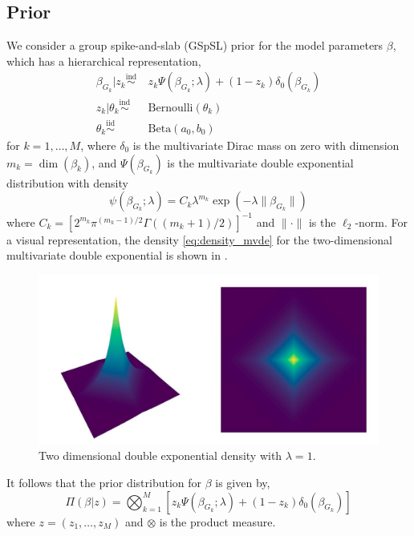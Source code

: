 \documentclass[12pt]{article}
\begin{document}
\subsection{Prior}

We consider a group spike-and-slab (GSpSL) prior for the model parameters $\beta$, which has a hierarchical representation,
\begin{equation}
\begin{aligned}
\beta_{G_k} | z_k \overset{\text{ind}}{\sim} &\ z_k \Psi(\beta_{G_k}; \lambda) + (1-z_k) \delta_0(\beta_{G_k}) \\
z_k | \theta_k \overset{\text{ind}}{\sim} &\ \text{Bernoulli}(\theta_k) \\
\theta_k \overset{\text{iid}}{\sim} &\ \text{Beta}(a_0, b_0)
\end{aligned}
\end{equation}
for $k=1,\dots,M$, where $\delta_0$ is the multivariate Dirac mass on zero with dimension $m_k = \dim(\beta_k)$, and $\Psi(\beta_{G_k})$ is the multivariate double exponential distribution with density
\begin{equation} \label{eq:density_mvde}
    \psi(\beta_{G_k}; \lambda) = C_k \lambda^{m_k} \exp \left( - \lambda \| \beta_{G_k} \| \right)
\end{equation}
where $ C_k = \left[ 2^{m_k} \pi^{(m_k -1)/2} \Gamma \left( (m_k + 1) /2 \right) \right]^{-1} $ and $ \| \cdot \| $ is the $\ell_2$-norm. For a visual representation, the density \eqref{eq:density_mvde} for the two-dimensional multivariate double exponential is shown in .
\begin{figure}[htp]
    \centering
    \includegraphics[width=.9\textwidth]{./figures/de.jpg}
    \caption{Two dimensional double exponential density with $\lambda=1$.}
    \label{fig:double_exp}
\end{figure}

It follows that the prior distribution for $\beta$ is given by,
\begin{equation} \label{eq:prior} 
    \Pi(\beta | z) = \bigotimes_{k=1}^{M} \left[ 
    z_k \Psi(\beta_{G_k}; \lambda) + (1-z_k)\delta_0(\beta_{G_k})
\right]
\end{equation}
where $z = (z_1, \dots, z_M)$ and $\otimes$ is the product measure.
\end{document}
